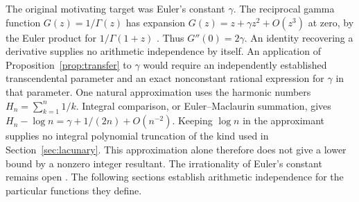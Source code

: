 \documentclass[11pt,a4paper]{article}
\theoremstyle{definition}
\theoremstyle{remark}
\numberwithin{equation}{section}
\begin{document}
The original motivating target was Euler's constant $\gamma$. The reciprocal gamma function $G(z)=1/\Gamma(z)$ has expansion $G(z)=z+\gamma z^2+O(z^3)$ at zero, by the Euler product for $1/\Gamma(1+z)$ \cite{DLMF}. Thus $G''(0)=2\gamma$. An identity recovering a derivative supplies no arithmetic independence by itself. An application of Proposition~\ref{prop:transfer} to $\gamma$ would require an independently established transcendental parameter and an exact nonconstant rational expression for $\gamma$ in that parameter. One natural approximation uses the harmonic numbers $H_n=\sum_{k=1}^n1/k$. Integral comparison, or Euler--Maclaurin summation, gives $H_n-\log n=\gamma+1/(2n)+O(n^{-2})$. Keeping $\log n$ in the approximant supplies no integral polynomial truncation of the kind used in Section~\ref{sec:lacunary}. This approximation alone therefore does not give a lower bound by a nonzero integer resultant. The irrationality of Euler's constant remains open \cite{EulerStatus}. The following sections establish arithmetic independence for the particular functions they define.
\end{document}
